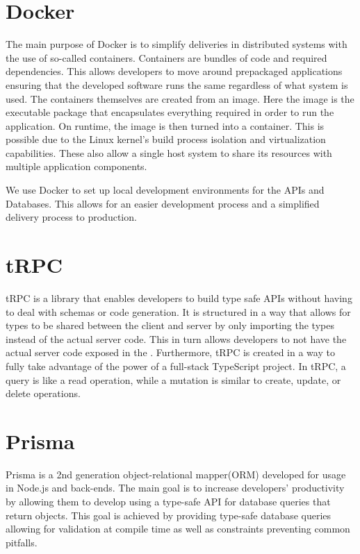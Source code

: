 \section*{Docker}
The main purpose of Docker is to simplify deliveries in distributed systems with the use of so-called containers\cite{Docker_Container}.
Containers are bundles of code and required dependencies. This allows developers to move around prepackaged applications ensuring that the developed software runs the same regardless of what system is used\cite{Docker_Container}.
The containers themselves are created from an image. Here the image is the executable package that encapsulates everything required in order to run the application. On runtime, the image is then turned into a container. 
This is possible due to the Linux kernel's build process isolation and virtualization capabilities. These also allow a single host system to share its resources with multiple application components\cite{Docker_Container}.

We use Docker to set up local development environments for the APIs and Databases. This allows for an easier development process and a simplified delivery process to production.

\section*{tRPC}
tRPC is a library that enables developers to build type safe APIs without having to deal with schemas or code generation. 
It is structured in a way that allows for types to be shared between the client and server by only importing the types instead of the actual server code. 
This in turn allows developers to not have the actual server code exposed in the \frontend{}. 
Furthermore, tRPC is created in a way to fully take advantage of the power of a full-stack TypeScript project\cite{tRPC}.
In tRPC, a query is like a read operation, while a mutation is similar to create, update, or delete operations.

\section*{Prisma}
Prisma is a 2nd generation object-relational mapper(ORM) developed for usage in Node.js and \typescript{} back-ends. 
The main goal is to increase developers' productivity by allowing them to develop using a type-safe API for database queries that return \javascript{} objects. 
This goal is achieved by providing type-safe database queries allowing for validation at compile time as well as constraints preventing common pitfalls\cite{Prisma_Why}.

